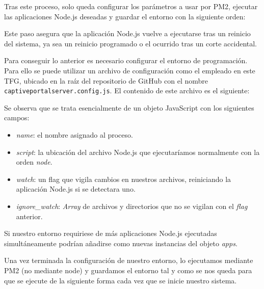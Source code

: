 \begin{appendices}
Tras este proceso, solo queda configurar los parámetros a usar por PM2, ejecutar las aplicaciones Node.js deseadas y guardar el entorno con la siguiente orden:


Este paso asegura que la aplicación Node.js vuelve a ejecutarse tras un reinicio del sistema, ya sea un reinicio programado o el ocurrido tras un corte accidental.

Para conseguir lo anterior es necesario configurar el entorno de programación. Para ello se puede utilizar un archivo de configuración como el empleado en este TFG, ubicado en la raíz del repositorio de GitHub con el nombre \verb+captiveportalserver.config.js+. El contenido de este archivo es el siguiente:


Se observa que se trata esencialmente de un objeto JavaScript con los siguientes campos:

\begin{itemize}
\item \emph{name}: el nombre asignado al proceso.
\item \emph{script}: la ubicación del archivo Node.js que ejecutaríamos normalmente con la orden \emph{node}.
\item \emph{watch}: un flag que vigila cambios en nuestros archivos, reiniciando la aplicación Node.js si se detectara uno.
\item \emph{ignore\_watch}: \emph{Array} de archivos y directorios que no se vigilan con el \emph{flag} anterior.
\end{itemize}

Si nuestro entorno requiriese de más aplicaciones Node.js ejecutadas simultáneamente podrían añadirse como nuevas instancias del objeto \emph{apps}.

Una vez terminada la configuración de nuestro entorno, lo ejecutamos mediante PM2 (no mediante node) y guardamos el entorno tal y como se nos queda para que se ejecute de la siguiente forma cada vez que se inicie nuestro sistema.


\end{appendices}
